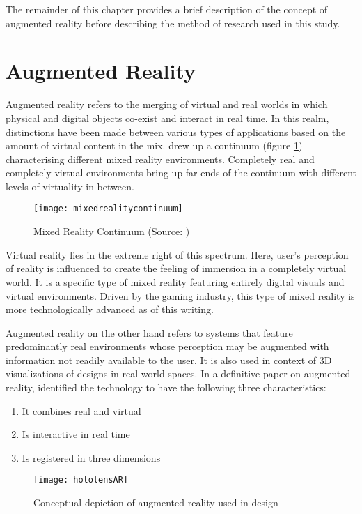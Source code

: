 The remainder of this chapter provides a brief description of the concept of augmented reality before describing the method of research used in this study.

\section{Augmented Reality}
\label{sec:augreal}
Augmented reality refers to the merging of virtual and real worlds in which physical and digital objects co-exist and interact in real time. In this realm, distinctions have been made between various types of applications based on the amount of virtual content in the mix. \cite{milgram1995augmented} drew up a continuum (figure \ref{fig:mixedrealitycontinuum}) characterising different mixed reality environments. Completely real and completely virtual environments bring up far ends of the continuum with different levels of virtuality in between. 

\begin{figure}
	\centering
	\texttt{[image: mixedrealitycontinuum]}
	\caption{Mixed Reality Continuum (Source: \cite{milgram1995augmented})}
	\label{fig:mixedrealitycontinuum}
\end{figure}

Virtual reality lies in the extreme right of this spectrum. Here, user's perception of reality is influenced to create the feeling of immersion in a completely virtual world. It is a specific type of mixed reality featuring entirely digital visuals and virtual environments. Driven by the gaming industry, this type of mixed reality is more technologically advanced as of this writing.

Augmented reality on the other hand refers to systems that feature predominantly real environments whose perception may be augmented with information not readily available to the user. It is also used in context of 3D visualizations of designs in real world spaces. In a definitive paper on augmented reality, \textcite{azuma1997survey} identified the technology to have the following three characteristics: 
\begin{enumerate}
	\item It combines real and virtual 
	\item Is interactive in real time
	\item Is registered in three dimensions
\end{enumerate} 



\begin{figure}
	\centering
	\texttt{[image: hololensAR]}
	\caption{Conceptual depiction of augmented reality used in design}
	\label{fig:augreal}
\end{figure}

